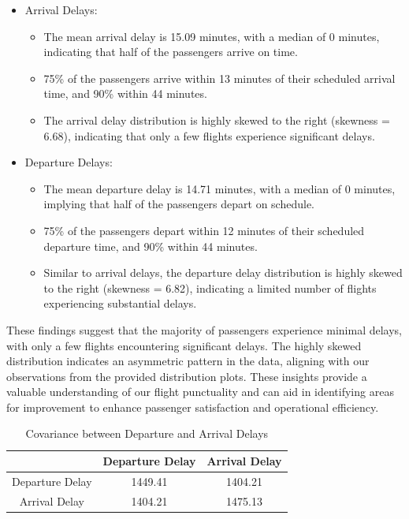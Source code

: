 \documentclass[11pt]{article}
\begin{document}
\begin{itemize}
    \item {Arrival Delays:}
    \begin{itemize}
        \item {The mean arrival delay is 15.09 minutes, with a median of 0 minutes, indicating that half of the passengers arrive on time. }
        \item {75\% of the passengers arrive within 13 minutes of their scheduled arrival time, and 90\% within 44 minutes.}
        \item {The arrival delay distribution is highly skewed to the right (skewness = 6.68), indicating that only a few flights experience significant delays.}
    \end{itemize}
    \item {Departure Delays: }
    \begin{itemize}
        \item {The mean departure delay is 14.71 minutes, with a median of 0 minutes, implying that half of the passengers depart on schedule.}
        \item {75\% of the passengers depart within 12 minutes of their scheduled departure time, and 90\% within 44 minutes.}
        \item {Similar to arrival delays, the departure delay distribution is highly skewed to the right (skewness = 6.82), indicating a limited number of flights experiencing substantial delays.}
    \end{itemize}
\end{itemize}


These findings suggest that the majority of passengers experience minimal delays, with only a few flights encountering significant delays. The highly skewed distribution indicates an asymmetric pattern in the data, aligning with our observations from the provided distribution plots. These insights provide a valuable understanding of our flight punctuality and can aid in identifying areas for improvement to enhance passenger satisfaction and operational efficiency.


\begin{table}[!h]
    \centering
    \begin{tabular}{|c|c|c|}
        \hline
        &  Departure Delay & Arrival Delay \\
        \hline
        Departure Delay   &   1449.41  &  1404.21 \\
        \hline
        Arrival Delay     &   1404.21  &  1475.13 \\
        \hline
    \end{tabular}
    \caption{Covariance between Departure and Arrival Delays}
    \label{tab:cov}
\end{table}
\end{document}

